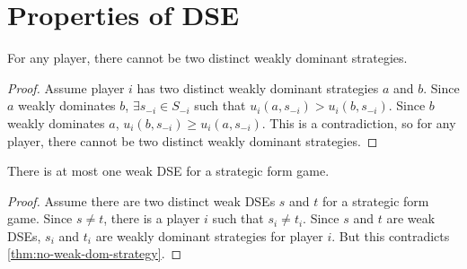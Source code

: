 \section{Properties of DSE}

\begin{lemma}
\label{thm:no-weak-dom-strategy}
For any player, there cannot be two distinct weakly dominant strategies.
\end{lemma}
\begin{proof}
Assume player $i$ has two distinct weakly dominant strategies $a$ and $b$.
Since $a$ weakly dominates $b$, $\exists s_{-i} \in S_{-i}$ such that
$u_i(a, s_{-i}) > u_i(b, s_{-i})$.
Since $b$ weakly dominates $a$, $u_i(b, s_{-i}) \ge u_i(a, s_{-i})$.
This is a contradiction, so for any player,
there cannot be two distinct weakly dominant strategies.
\end{proof}

\begin{theorem}
There is at most one weak DSE for a strategic form game.
\end{theorem}
\begin{proof}
Assume there are two distinct weak DSEs $s$ and $t$ for a strategic form game.
Since $s \neq t$, there is a player $i$ such that $s_i \neq t_i$.
Since $s$ and $t$ are weak DSEs, $s_i$ and $t_i$ are weakly dominant strategies for player $i$.
But this contradicts \cref{thm:no-weak-dom-strategy}.
\end{proof}



